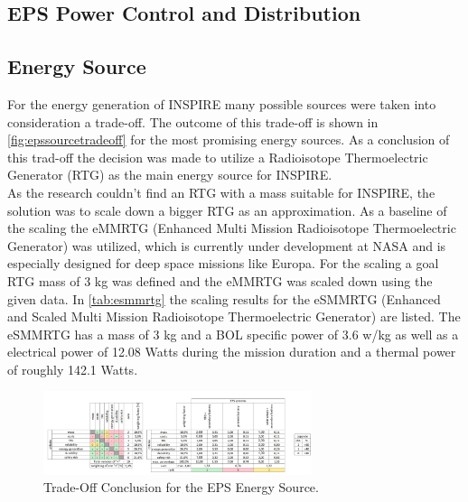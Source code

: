 \subsection{EPS Power Control and Distribution}

\subsection{Energy Source}
For the energy generation of INSPIRE many possible sources were taken into consideration a trade-off. The outcome of this trade-off is shown in \autoref{fig:epssourcetradeoff} for the most promising energy sources. As a conclusion of this trad-off the decision was made to utilize a Radioisotope Thermoelectric Generator (RTG) as the main energy source for INSPIRE. \\

As the research couldn't find an RTG with a mass suitable for INSPIRE, the solution was to scale down a bigger RTG as an approximation. As a baseline of the scaling the eMMRTG (Enhanced Multi Mission Radioisotope Thermoelectric Generator) was utilized, which is currently under development at NASA and is especially designed for deep space missions like Europa. For the scaling a goal RTG mass of 3 kg was defined and the eMMRTG was scaled down using the given data.
In \autoref{tab:esmmrtg} the scaling results for the eSMMRTG (Enhanced and Scaled Multi Mission Radioisotope Thermoelectric Generator) are listed. The eSMMRTG has a mass of 3 kg and a BOL specific power of 3.6 w/kg as well as a electrical power of 12.08 Watts during the mission duration and a thermal power of roughly 142.1 Watts.



\begin{figure}[htb]
{\centering
\includegraphics[width=0.7\textwidth]{Media/epssourcetradeoff}
\caption{Trade-Off Conclusion for the EPS Energy Source.}
\label{fig:epssourcetradeoff}
}
\end{figure}

